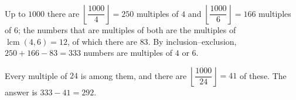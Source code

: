 Up to $1000$ there are $\left\lfloor\dfrac{1000}{4}\right\rfloor=250$ multiples of $4$ and $\left\lfloor\dfrac{1000}{6}\right\rfloor=166$ multiples of $6$; the numbers that are multiples of both are the multiples of $\operatorname{lcm}(4,6)=12$, of which there are $83$. By inclusion--exclusion, $250+166-83=333$ numbers are multiples of $4$ or $6$.

Every multiple of $24$ is among them, and there are $\left\lfloor\dfrac{1000}{24}\right\rfloor=41$ of these. The answer is $333-41=\boxed{292}$.

